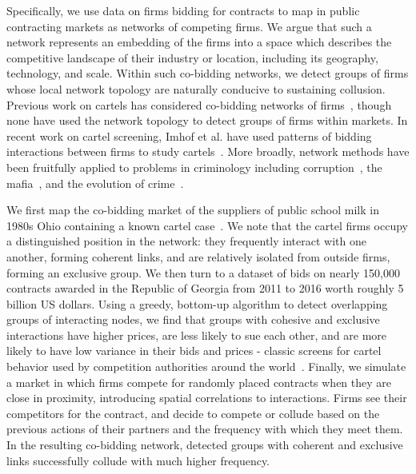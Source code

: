 Specifically, we use data on firms bidding for contracts to map in public contracting markets as networks of competing firms. We argue that such a network represents an embedding of the firms into a space which describes the competitive landscape of their industry or location, including its geography, technology, and scale. Within such co-bidding networks, we detect groups of firms whose local network topology are naturally conducive to sustaining collusion. Previous work on cartels has considered co-bidding networks of firms~\cite{toth2014toolkit,reeves2017bid,morselli2018network}, though none have used the network topology to detect groups of firms within markets. In recent work on cartel screening, Imhof et al. have used patterns of bidding interactions between firms to study cartels~\cite{imhof2018screening}. More broadly, network methods have been fruitfully applied to problems in criminology including corruption~\cite{fazekas2017corruption,ribeiro2018dynamical}, the mafia~\cite{agreste2016network}, and the evolution of crime~\cite{rostami2015complexity}.

We first map the co-bidding market of the suppliers of public school milk in 1980s Ohio containing a known cartel case~\cite{porter1999ohio}. We note that the cartel firms occupy a distinguished position in the network: they frequently interact with one another, forming coherent links, and are relatively isolated from outside firms, forming an exclusive group. We then turn to a dataset of bids on nearly 150,000 contracts awarded in the Republic of Georgia from 2011 to 2016 worth roughly 5 billion US dollars. Using a greedy, bottom-up algorithm to detect overlapping groups of interacting nodes, we find that groups with cohesive and exclusive interactions have higher prices, are less likely to sue each other, and are more likely to have low variance in their bids and prices - classic screens for cartel behavior used by competition authorities around the world~\cite{abrantes2006variance}. Finally, we simulate a market in which firms compete for randomly placed contracts when they are close in proximity, introducing spatial correlations to interactions. Firms see their competitors for the contract, and decide to compete or collude based on the previous actions of their partners and the frequency with which they meet them. In the resulting co-bidding network, detected groups with coherent and exclusive links successfully collude with much higher frequency.

